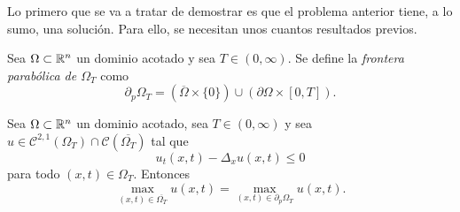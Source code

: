 \documentclass[a4paper, 12pt, extrafontsizes]{memoir}
\begin{document}
Lo primero que se va a tratar de demostrar es que el problema anterior tiene, a lo sumo, una solución. Para ello, se necesitan unos cuantos resultados previos.

\begin{definition}
    Sea $\Omega \subset \mathbb R^n$ un dominio acotado y sea $T\in (0,\infty)$. Se define la \emph{frontera parabólica de $\Omega_T$} como
    \[\partial_p\Omega_T = (\overline{\Omega} \times \{0\}) \cup (\partial \Omega \times [0,T]).\]
\end{definition}

\begin{theorem}
    Sea $\Omega \subset \mathbb R^n$ un dominio acotado, sea $T \in (0,\infty)$ y sea $u \in \mathcal{C}^{2,1}(\Omega_T) \cap \mathcal{C}(\overline{\Omega_T})$ tal que
    \[u_t(x,t)-\Delta_xu(x,t) \leq 0\]
    para todo $(x,t) \in \Omega_T$. Entonces
    \[\max_{(x,t)\in \overline{\Omega_T}} u(x,t) = \max_{(x,t) \in \partial_p\Omega_T}u(x,t).\]
\end{theorem}
\end{document}
